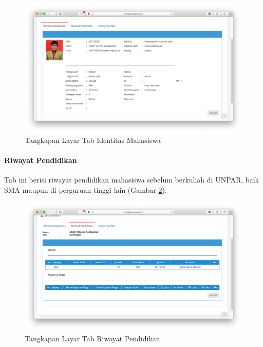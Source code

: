 \begin{figure}[H]
    \centering
    \includegraphics[scale=0.31]{Gambar/siakad_datadiri_identitasmahasiswa.png}
    \caption{Tangkapan Layar Tab Identitas Mahasiswa}
    \label{fig:3_siakad_datadiri_identitasmahasiswa}
\end{figure}

\paragraph{Riwayat Pendidikan} Tab ini berisi riwayat pendidikan mahasiswa sebelum berkuliah di UNPAR, baik SMA maupun di perguruan tinggi lain (Gambar \ref{fig:3_siakad_datadiri_riwayatpendidikan}).

\begin{figure}[H]
    \centering
    \includegraphics[scale=0.31]{Gambar/siakad_datadiri_riwayatpendidikan.png}
    \caption{Tangkapan Layar Tab Riwayat Pendidikan}
    \label{fig:3_siakad_datadiri_riwayatpendidikan}
\end{figure}

